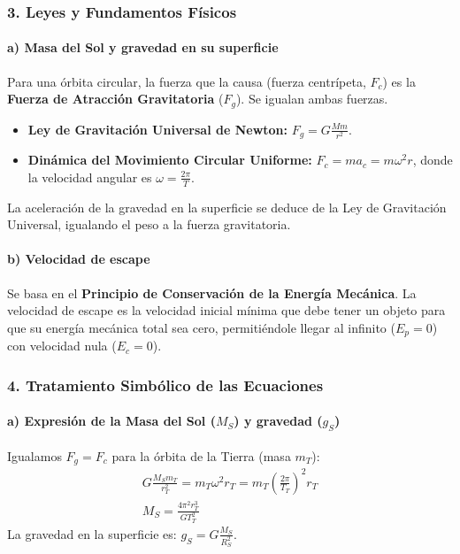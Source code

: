 \subsubsection*{3. Leyes y Fundamentos Físicos}
\paragraph*{a) Masa del Sol y gravedad en su superficie}
Para una órbita circular, la fuerza que la causa (fuerza centrípeta, $F_c$) es la \textbf{Fuerza de Atracción Gravitatoria} ($F_g$). Se igualan ambas fuerzas.
\begin{itemize}
    \item \textbf{Ley de Gravitación Universal de Newton:} $F_g = G \frac{M m}{r^2}$.
    \item \textbf{Dinámica del Movimiento Circular Uniforme:} $F_c = m a_c = m \omega^2 r$, donde la velocidad angular es $\omega = \frac{2\pi}{T}$.
\end{itemize}
La aceleración de la gravedad en la superficie se deduce de la Ley de Gravitación Universal, igualando el peso a la fuerza gravitatoria.

\paragraph*{b) Velocidad de escape}
Se basa en el \textbf{Principio de Conservación de la Energía Mecánica}. La velocidad de escape es la velocidad inicial mínima que debe tener un objeto para que su energía mecánica total sea cero, permitiéndole llegar al infinito ($E_p=0$) con velocidad nula ($E_c=0$).

\subsubsection*{4. Tratamiento Simbólico de las Ecuaciones}
\paragraph*{a) Expresión de la Masa del Sol ($M_S$) y gravedad ($g_S$)}
Igualamos $F_g = F_c$ para la órbita de la Tierra (masa $m_T$):
\begin{gather}
    G \frac{M_S m_T}{r_T^2} = m_T \omega^2 r_T = m_T \left(\frac{2\pi}{T_T}\right)^2 r_T \nonumber \\[8pt]
    M_S = \frac{4\pi^2 r_T^3}{G T_T^2}
\end{gather}
La gravedad en la superficie es: $g_S = G \frac{M_S}{R_S^2}$.

